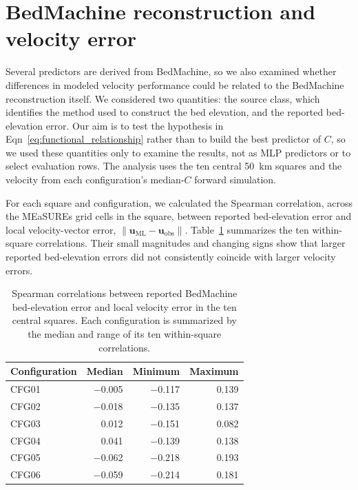 \documentclass[review,jog]{igs}
\begin{document}
\section{BedMachine reconstruction and velocity error}
\label{app:bedmachine_diagnostics}

Several predictors are derived from BedMachine, so we also examined whether differences in modeled velocity performance could be related to the BedMachine reconstruction itself. We considered two quantities: the source class, which identifies the method used to construct the bed elevation, and the reported bed-elevation error. Our aim is to test the hypothesis in Eqn~\ref{eq:functional_relationship} rather than to build the best predictor of $C$, so we used these quantities only to examine the results, not as MLP predictors or to select evaluation rows. The analysis uses the ten central 50~km squares and the velocity from each configuration's median-$C$ forward simulation.

For each square and configuration, we calculated the Spearman correlation, across the MEaSUREs grid cells in the square, between reported bed-elevation error and local velocity-vector error, $\lVert\mathbf{u}_{\mathrm{ML}}-\mathbf{u}_{\mathrm{obs}}\rVert$. Table~\ref{tab:bedmachine_error_correlations} summarizes the ten within-square correlations. Their small magnitudes and changing signs
show that larger reported bed-elevation errors did not consistently
coincide with larger velocity errors.

\begin{table}
\centering
\caption{Spearman correlations between reported BedMachine
bed-elevation error and local velocity error in the ten central
squares. Each configuration is summarized by the median and range
of its ten within-square correlations.}
\label{tab:bedmachine_error_correlations}
\begin{tabular}{lrrr}
\hline
Configuration & Median & Minimum & Maximum \\
\hline
CFG01 & $-$0.005 & $-$0.117 & 0.139 \\
CFG02 & $-$0.018 & $-$0.135 & 0.137 \\
CFG03 &  0.012 & $-$0.151 & 0.082 \\
CFG04 &  0.041 & $-$0.139 & 0.138 \\
CFG05 & $-$0.062 & $-$0.218 & 0.193 \\
CFG06 & $-$0.059 & $-$0.214 & 0.181 \\
\hline
\end{tabular}
\end{table}
\end{document}
